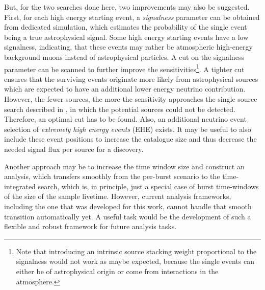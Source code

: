 But, for the two searches done here, two improvements may also be suggested.
First, for each high energy starting event, a \emph{signalness} parameter can be obtained from dedicated simulation, which estimates the probability of the single event being a true astrophysical signal.
Some high energy starting events have a low signalness, indicating, that these events may rather be atmospheric high-energy background muons instead of astrophysical particles.
A cut on the signalness parameter can be scanned to further improve the sensitivities\footnote{Note that introducing an intrinsic source stacking weight proportional to the signalness would not work as maybe expected, because the single events can either be of astrophysical origin or come from interactions in the atmosphere.}.
A tighter cut ensures that the surviving events originate more likely from astrophysical sources which are expected to have an additional lower energy neutrino contribution.
However, the fewer sources, the more the sensitivity approaches the single source search described in \cite{Aartsen:2016oji}, in which the potential sources could not be detected.
Therefore, an optimal cut has to be found.
Also, an additional neutrino event selection of \emph{extremely high energy events} (EHE) exists\cite{Yoshida:2017ghs,Aartsen:2016ngq}.
It may be useful to also include these event positions to increase the catalogue size and thus decrease the needed signal flux per source for a discovery.

Another approach may be to increase the time window size and construct an analysis, which transfers smoothly from the per-burst scenario to the time-integrated search, which is, in principle, just a special case of burst time-windows of the size of the sample livetime.
However, current analysis frameworks, including the one that was developed for this work, cannot handle that smooth transition automatically yet.
A useful task would be the development of such a flexible and robust framework for future analysis tasks.


